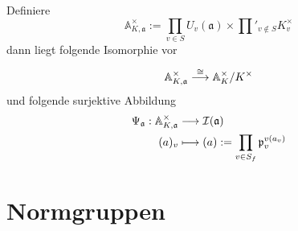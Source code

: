 \documentclass{book}
\renewcommand{\A}{\mathbb{A}}
\newcommand{\af}{\mathfrak{a}}
\newcommand{\pf}{\mathfrak{p}}
\begin{document}
\Bem{}
Definiere
\[ \A_{K,\af}^\times := \prod_{v \in S}U_v(\af) \times \prod'_{v\notin S} K_v^\times \]
dann liegt folgende Isomorphie vor
\[ \A_{K,\af}^\times \Pfeil{\isom{}} \A_K^\times / K^\times \]
und folgende surjektive Abbildung
\begin{align*}
\Psi_\af : \A_{K,\af}^\times &\Pfeil{} \I(\af)\\
(a)_v & \longmapsto (a) := \prod_{v\in S_f}\pf_v^{v(a_v)}
\end{align*}


\section{Normgruppen}
\end{document}
